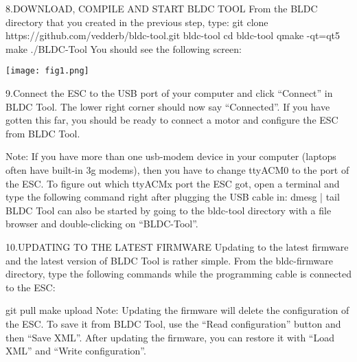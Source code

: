 \documentclass[11pt]{article}
\begin{document}
8.DOWNLOAD, COMPILE AND START BLDC TOOL\newline
From the BLDC directory that you created in the previous step, type:\newline
git clone https://github.com/vedderb/bldc-tool.git bldc-tool\newline
cd bldc-tool\newline
qmake -qt=qt5\newline
make ./BLDC-Tool\newline
You should see the following screen:\newline


\begin {center}
\texttt{[image: fig1.png]}\newline

\end{center}

9.Connect the ESC to the USB port of your computer and click “Connect” in BLDC Tool. The lower right corner should now say “Connected”. If you have gotten this far, you should be ready to connect a motor and configure the ESC from BLDC Tool.\newline

Note: If you have more than one usb-modem device in your computer (laptops often have built-in 3g modems), then you have to change ttyACM0 to the port of the ESC. To figure out which ttyACMx port the ESC got, open a terminal and type the following command right after plugging the USB cable in:\newline
 dmesg | tail\newline
BLDC Tool can also be started by going to the bldc-tool directory with a file browser and double-clicking on “BLDC-Tool”.\newline

10.UPDATING TO THE LATEST FIRMWARE\newline
Updating to the latest firmware and the latest version of BLDC Tool is rather simple. From the bldc-firmware directory, type the following commands while the programming cable is connected to the ESC:\newline

git pull\newline
make upload\newline
Note: Updating the firmware will delete the configuration of the ESC. To save it from BLDC Tool, use the “Read configuration” button and then “Save XML”. After updating the firmware, you can restore it with “Load XML” and “Write configuration”.\newline
\end{document}
